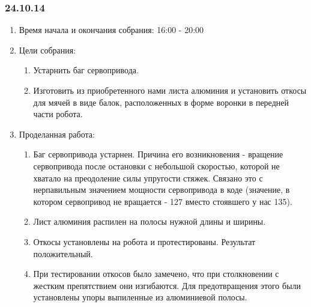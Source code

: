 
\subsubsection{24.10.14}

\begin{enumerate}
	\item Время начала и окончания собрания:
	16:00 - 20:00
	\item Цели собрания:
	\begin{enumerate}
	  \item Устарнить баг сервопривода.
	  
	  \item Изготовить из приобретенного нами листа алюминия и установить откосы для мячей в виде балок, расположенных в форме воронки в передней части робота.
	  
    \end{enumerate}
    
	\item Проделанная работа:
	\begin{enumerate}
	  \item Баг сервопривода устарнен. Причина его возникновения - вращение сервопривода после остановки с небольшой скоростью, которой не хватало на преодоление силы упругости стяжек. Связано это с нерпавильным значением мощности сервопривода в коде (значение, в котором сервопривод не вращается - 127 вместо стоявшего у нас 135).
      
      \item Лист алюминия распилен на полосы нужной длины и ширины.
      
      \item Откосы установлены на робота и протестированы. Результат положительный.
      
      \item При тестировании откосов было замечено, что при столкновении с жестким препятствием они изгибаются. Для предотвращения этого были установлены упоры выпиленные из алюминиевой полосы.
      

\end{enumerate}
\end{enumerate}
